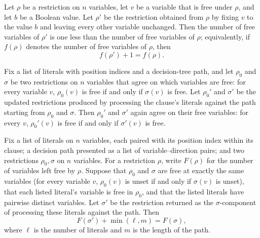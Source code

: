 \begin{lemma}
\label{SwitchingLemma.numFree_update_free}
\leanok
{}
Let $\rho$ be a restriction on $n$ variables, let $v$ be a variable that is free under
$\rho$, and let $b$ be a Boolean value. Let $\rho'$ be the restriction obtained from
$\rho$ by fixing $v$ to the value $b$ and leaving every other variable unchanged. Then
the number of free variables of $\rho'$ is one less than the number of free variables of
$\rho$; equivalently, if $f(\rho)$ denotes the number of free variables of $\rho$, then
\[
f(\rho') + 1 = f(\rho).
\]
\end{lemma}

\begin{lemma}
\label{SwitchingLemma.processClauseLits_freeVars_agree}
\leanok
{}
Fix a list of literals with position indices and a decision-tree path, and let $\rho_0$
and $\sigma$ be two restrictions on $n$ variables that agree on which variables are
free: for every variable $v$, $\rho_0(v)$ is free if and only if $\sigma(v)$ is free.
Let $\rho_0'$ and $\sigma'$ be the updated restrictions produced by processing the
clause's literals against the path starting from $\rho_0$ and $\sigma$. Then $\rho_0'$
and $\sigma'$ again agree on their free variables: for every $v$, $\rho_0'(v)$ is free
if and only if $\sigma'(v)$ is free.
\end{lemma}

\begin{lemma}
\label{SwitchingLemma.processClauseLits_numFree_σ}
\leanok
{}
Fix a list of literals on $n$ variables, each paired with its position index within its
clause; a decision path presented as a list of variable–direction pairs; and two
restrictions $\rho_0, \sigma$ on $n$ variables. For a restriction $\rho$, write
$F(\rho)$ for the number of variables left free by $\rho$. Suppose that $\rho_0$ and
$\sigma$ are free at exactly the same variables (for every variable $v$, $\rho_0(v)$ is
unset if and only if $\sigma(v)$ is unset), that each listed literal's variable is free
in $\rho_0$, and that the listed literals have pairwise distinct variables. Let
$\sigma'$ be the restriction returned as the $\sigma$-component of processing these
literals against the path. Then
\[
F(\sigma') + \min(\ell, m) = F(\sigma),
\]
where $\ell$ is the number of literals and $m$ is the length of the path.
\end{lemma}


